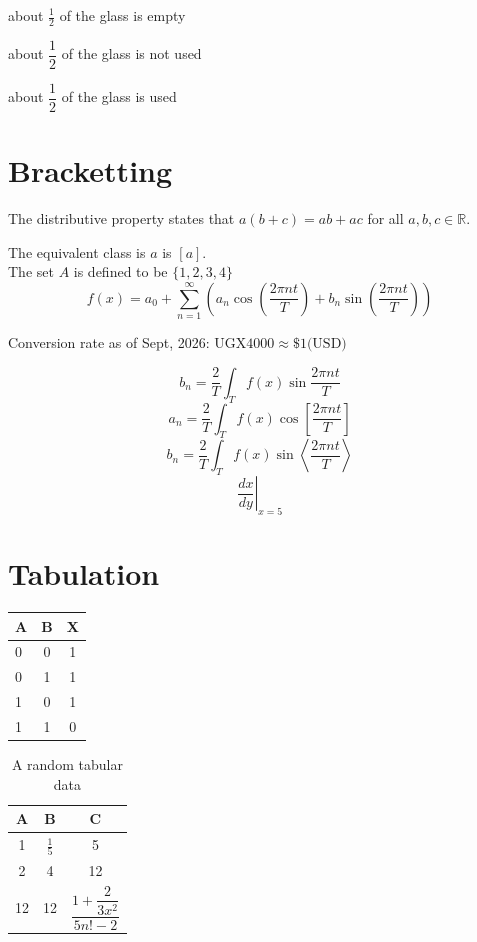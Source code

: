 \documentclass[14pt]{article}
\begin{document}
	about $\displaystyle\frac12$ of the glass is empty
			
	about $\dfrac{1}{2}$ of the glass is not used
	
	about $\dfrac{1}{2}$ of the glass is used
	
	\section{Bracketting}
	
	The distributive property states that $a(b+c) = ab + ac$ for all $a, b, c \in \mathbb{R}$.
	
	The equivalent class is $a$ is $[a]$.\\
	The set $A$ is defined to be $\{1,2,3,4\}$
	$$f(x)=a_0 + \sum^{\infty}_{n=1} \left(
		a_n\cos\left(\frac{2\pi nt}{T}\right) + 
		b_n\sin\left(\frac{2\pi nt}{T}\right) 
	\right)$$
	
	Conversion rate as of Sept, 2026: $\text{UGX}4000\approx\$1\text{(USD)}$
	
	$$b_n=\frac{2}{T}\int_Tf(x)\sin\frac{2\pi nt}{T}$$
	$$a_n=\frac{2}{T}\int_Tf(x)\cos\left[\frac{2\pi nt}{T}\right]$$
	$$b_n=\frac{2}{T}\int_Tf(x)\sin\left\langle\frac{2\pi nt}{T}\right\rangle$$
	$$\left.\frac{dx}{dy}\right|_{x=5}$$
	
	\section{Tabulation}
	
	\begin{tabular}{|lc||c|}
	\hline
	A & B & X \\
	\hline
	0 & 0 & 1 \\
	0 & 1 & 1 \\
	1 & 0 & 1 \\
	1 & 1 & 0 \\
	\hline
	
	\end{tabular}
	
	\begin{table}
		\centering
		\def \arraystretch{1.5}
	
		\begin{tabular}{|c|c|c|}
		\hline
			A & B & C \\
		\hline
			1 & $\frac{1}{5}$ & 5\\ \hline
			2 & 4 & 12\\ \hline
			12 & 12 & $\dfrac{1+\dfrac{2}{3x^2}}{5n!-2}$\\
		\hline
		\end{tabular}
		\caption{A random tabular data}
	\end{table}
	
\end{document}
